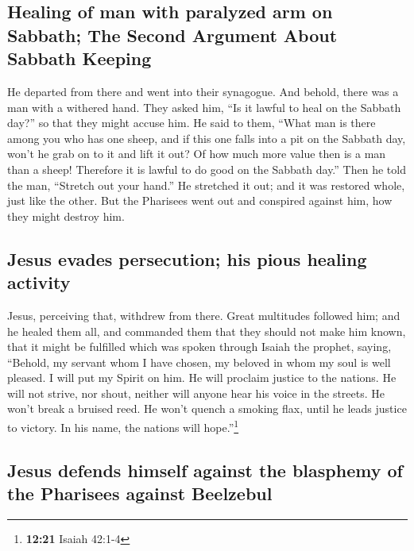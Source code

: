 \begin{paracol}{2}
\begin{otherlanguage}{english}
{\subsection{Healing of man with paralyzed arm on Sabbath; The Second
Argument About Sabbath
Keeping}\label{healing-of-man-with-paralyzed-arm-on-sabbath-the-second-argument-about-sabbath-keeping}}

 He departed from there and went into their synagogue.
 And behold, there was a man with a withered hand. They
asked him, ``Is it lawful to heal on the Sabbath day?'' so that they
might accuse him.  He said to them, ``What man is there
among you who has one sheep, and if this one falls into a pit on the
Sabbath day, won't he grab on to it and lift it out?  Of
how much more value then is a man than a sheep! Therefore it is lawful
to do good on the Sabbath day.''  Then he told the man,
``Stretch out your hand.'' He stretched it out; and it was restored
whole, just like the other.  But the Pharisees went out
and conspired against him, how they might destroy him.

\hypertarget{jesus-evades-persecution-his-pious-healing-activity}{%
\subsection{Jesus evades persecution; his pious healing
activity}\label{jesus-evades-persecution-his-pious-healing-activity}}

 Jesus, perceiving that, withdrew from there. Great
multitudes followed him; and he healed them all,  and
commanded them that they should not make him known,  that
it might be fulfilled which was spoken through Isaiah the prophet,
saying,  ``Behold, my servant whom I have chosen, my
beloved in whom my soul is well pleased. I will put my Spirit on him. He
will proclaim justice to the nations.  He will not
strive, nor shout, neither will anyone hear his voice in the streets.
 He won't break a bruised reed. He won't quench a smoking
flax, until he leads justice to victory.  In his name,
the nations will hope.''\footnote{\textbf{12:21} Isaiah 42:1-4}

\hypertarget{jesus-defends-himself-against-the-blasphemy-of-the-pharisees-against-beelzebul}{%
\subsection{Jesus defends himself against the blasphemy of the Pharisees
against
Beelzebul}\label{jesus-defends-himself-against-the-blasphemy-of-the-pharisees-against-beelzebul}}


\end{otherlanguage}
\end{paracol}
